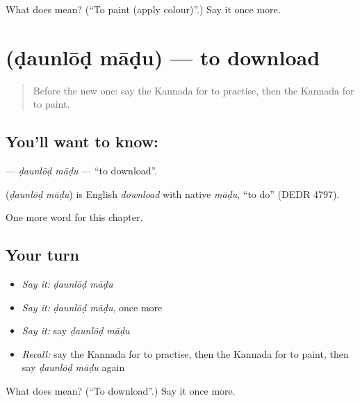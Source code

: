 \begin{tcolorbox}[breakable,colback=teal!4,colframe=teal!35!black,title={Before you move on}]
What does   mean? (\textquotedblleft{}To paint (apply colour)\textquotedblright{}.) Say it once more.
\end{tcolorbox}
\section[\texorpdfstring{\kn{ಡೌನ್ಲೋಡ್} \kn{ಮಾಡು} (ḍaunlōḍ māḍu)}{ಡೌನ್ಲೋಡ್ ಮಾಡು (ḍaunlōḍ māḍu)}]{  (ḍaunlōḍ māḍu) — to download}

\label{lesson:KA-C277-daunlod-madu}



\begin{quote}
Before the new one: say the Kannada for to practise, then the Kannada for to paint.
\end{quote}

\subsection*{You'll want to know:  }
\textbf{ } — \emph{ḍaunlōḍ māḍu} — \textquotedblleft{}to download\textquotedblright{}.

\begin{cousinweb}
\textbf{ } (\emph{ḍaunlōḍ māḍu}) is English \emph{download} with native \emph{māḍu}, \textquotedblleft{}to do\textquotedblright{} (DEDR 4797).
\end{cousinweb}

\begin{grammarlens}[title={What you've built}]
One more word for this chapter.
\end{grammarlens}

\subsection*{Your turn}
\begin{itemize}
\raggedright
  \item \emph{Say it:} \emph{ḍaunlōḍ māḍu}
  \item \emph{Say it:} \emph{ḍaunlōḍ māḍu}, once more
  \item \emph{Say it:} say \emph{ḍaunlōḍ māḍu}
  \item \emph{Recall:} say the Kannada for to practise, then the Kannada for to paint, then say \emph{ḍaunlōḍ māḍu} again
\end{itemize}

\begin{tcolorbox}[breakable,colback=teal!4,colframe=teal!35!black,title={Before you move on}]
What does   mean? (\textquotedblleft{}To download\textquotedblright{}.) Say it once more.
\end{tcolorbox}

